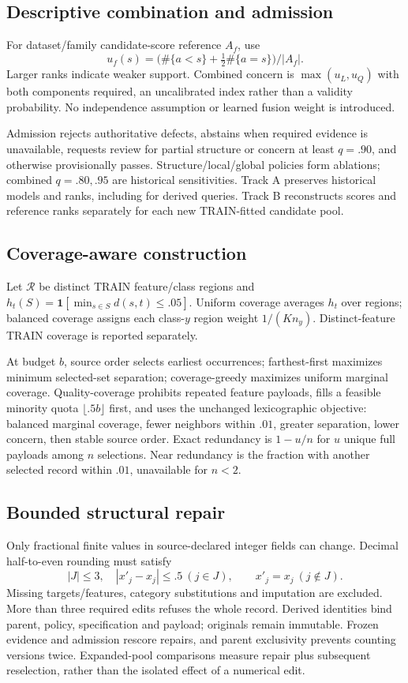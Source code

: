 \subsection{Descriptive combination and admission}
For dataset/family candidate-score reference $A_f$, use
\begin{equation}
u_f(s)=\bigl(\#\{a<s\}+\tfrac12\#\{a=s\}\bigr)/|A_f|.
\end{equation}
Larger ranks indicate weaker support. Combined concern is $\max(u_L,u_Q)$ with both components required, an uncalibrated index rather than a validity probability. No independence assumption or learned fusion weight is introduced.

Admission rejects authoritative defects, abstains when required evidence is unavailable, requests review for partial structure or concern at least $q=.90$, and otherwise provisionally passes. Structure/local/global policies form ablations; combined $q=.80,.95$ are historical sensitivities. Track A preserves historical models and ranks, including for derived queries. Track B reconstructs scores and reference ranks separately for each new TRAIN-fitted candidate pool.

\subsection{Coverage-aware construction}
Let $\mathcal R$ be distinct TRAIN feature/class regions and $h_t(S)=\mathbf1[\min_{s\in S}d(s,t)\le .05]$. Uniform coverage averages $h_t$ over regions; balanced coverage assigns each class-$y$ region weight $1/(K n_y)$. Distinct-feature TRAIN coverage is reported separately.

At budget $b$, source order selects earliest occurrences; farthest-first maximizes minimum selected-set separation; coverage-greedy maximizes uniform marginal coverage. Quality-coverage prohibits repeated feature payloads, fills a feasible minority quota $\lfloor .5b\rfloor$ first, and uses the unchanged lexicographic objective: balanced marginal coverage, fewer neighbors within $.01$, greater separation, lower concern, then stable source order. Exact redundancy is $1-u/n$ for $u$ unique full payloads among $n$ selections. Near redundancy is the fraction with another selected record within $.01$, unavailable for $n<2$.

\subsection{Bounded structural repair}
Only fractional finite values in source-declared integer fields can change. Decimal half-to-even rounding must satisfy
\begin{equation}
|J|\le3,\quad |x'_j-x_j|\le .5\ (j\in J),\qquad x'_j=x_j\ (j\notin J).
\end{equation}
Missing targets/features, category substitutions and imputation are excluded. More than three required edits refuses the whole record. Derived identities bind parent, policy, specification and payload; originals remain immutable. Frozen evidence and admission rescore repairs, and parent exclusivity prevents counting versions twice. Expanded-pool comparisons measure repair plus subsequent reselection, rather than the isolated effect of a numerical edit.
